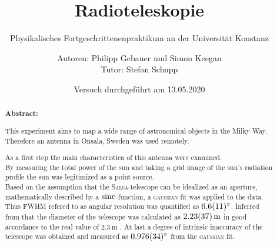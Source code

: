 \title{Radioteleskopie}
\subtitle{Physikalisches Fortgeschrittenenpraktikum an der Universität Konstanz}
\author{Autoren: Philipp Gebauer und Simon Keegan \\ \large{Tutor: Stefan Schupp}}
\date{Versuch durchgeführt am 13.05.2020}
\maketitle
\vspace{2.5 cm}
\begin{abstract}
    \vspace{1cm}
    \noindent \textbf{Abstract:}
    \begin{singlespace}
    This experiment aims to map a wide range of astronomical objects in the Milky Way. Therefore an antenna in Onsala, Sweden was used remotely.

    As a first step the main characteristica of this antenna were examined.\\
    By measuring the total power of the sun and taking a grid image of the sun's radiation profile the sun was legitimized as a point source. \\
    Based on the assumption that the \textsc{Salsa}-telescope can be idealized as an aperture, mathematically described by a $\operatorname{sinc}$-function, a \textsc{gaussian} fit was applied to the data. Thus FWHM refered to as angular resolution was quantified as $\SI{6.6 \pm 1.1}{\degree}$. Inferred from that the diameter of the telescope was calculated as $\SI{2.23 \pm 0.37}{\metre}$ in good accordance to the real value of $\SI{2.3}{\metre}$ \cite{Usermanual}. At last a degree of intrinsic inaccuracy of the telescope was obtained and measured as $\SI{0.976 \pm 0.034}{\degree}$ from the \textsc{gaussian} fit.
    \end{singlespace}
\end{abstract}
\thispagestyle{empty}
\newpage